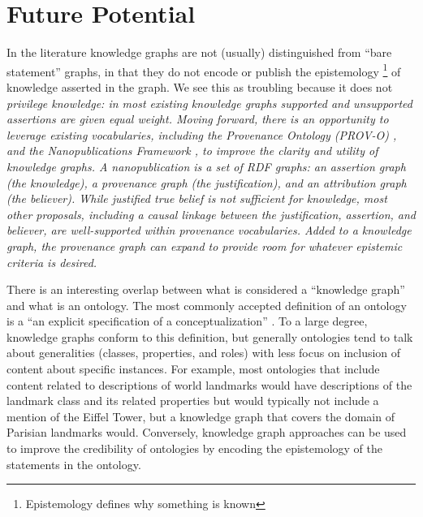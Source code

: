 \section{Future Potential}

In the literature knowledge graphs are not (usually) distinguished from ``bare statement'' graphs, in that they do not encode or publish the epistemology \footnote{Epistemology defines why something is known} of knowledge asserted in the graph.
We see this as troubling because it does not \em{privilege} knowledge: in most existing knowledge graphs supported and unsupported assertions are given equal weight.
Moving forward, there is an opportunity to leverage existing vocabularies, including the Provenance Ontology (PROV-O) \cite{Moreau_2015}, and the Nanopublications Framework \cite{groth2010anatomy}, to improve the clarity and utility of knowledge graphs.
A nanopublication is a set of RDF graphs: an \em{assertion graph} (the knowledge), a \em{provenance graph} (the justification), and an \em{attribution graph} (the believer).
While justified true belief is not sufficient for knowledge, most other proposals, including a causal linkage between the justification, assertion, and believer, are well-supported within provenance vocabularies.
Added to a knowledge graph, the provenance graph can expand to provide room for whatever epistemic criteria is desired.

There is an interesting overlap between what is considered a ``knowledge graph'' and what is an ontology.
The most commonly accepted definition of an ontology is a ``an explicit specification of a conceptualization'' \cite{Gruber_1993}.
To a large degree, knowledge graphs conform to this definition, but generally ontologies tend to talk about generalities (classes, properties, and roles) with less focus on inclusion of content about specific instances.
For example, most ontologies that include content related to descriptions of world landmarks would have descriptions of the landmark class and its related properties but would typically not include a mention of the Eiffel Tower, but a knowledge graph that covers the domain of Parisian landmarks would.
Conversely, knowledge graph approaches can be used to improve the credibility of ontologies by encoding the epistemology of the statements in the ontology.
